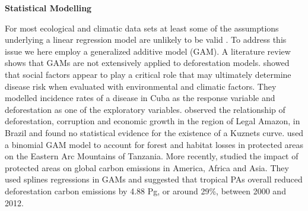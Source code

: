 




\textbf{Statistical Modelling} 




For most ecological and climatic data sets at least some of the assumptions underlying a linear regression model are unlikely to be valid \citep{zuur_2011}.   To address this issue we here employ a generalized additive model (GAM). A literature review shows that GAMs are not extensively applied to deforestation models. \citet{COHEN_2008} showed that social factors appear to play a critical role that may ultimately determine disease risk when evaluated with environmental and climatic factors. They modelled incidence rates of a disease in Cuba as the response variable and deforestation as one of the exploratory variables. \citet{MENDES_2012} observed the relationship of deforestation, corruption and economic growth in the region of Legal Amazon, in Brazil and found no statistical evidence for the existence of a Kuznets curve. \citet{GREEN_2013} used a binomial GAM model to account for forest and habitat losses in protected areas on the Eastern Arc Mountains of Tanzania. More recently, \citet{BEBBER_2017} studied the impact of protected areas on global carbon emissions in America, Africa and Asia. They used splines regressions in GAMs and suggested that tropical PAs overall reduced deforestation carbon emissions by 4.88 Pg, or around 29\%, between 2000 and 2012. 


